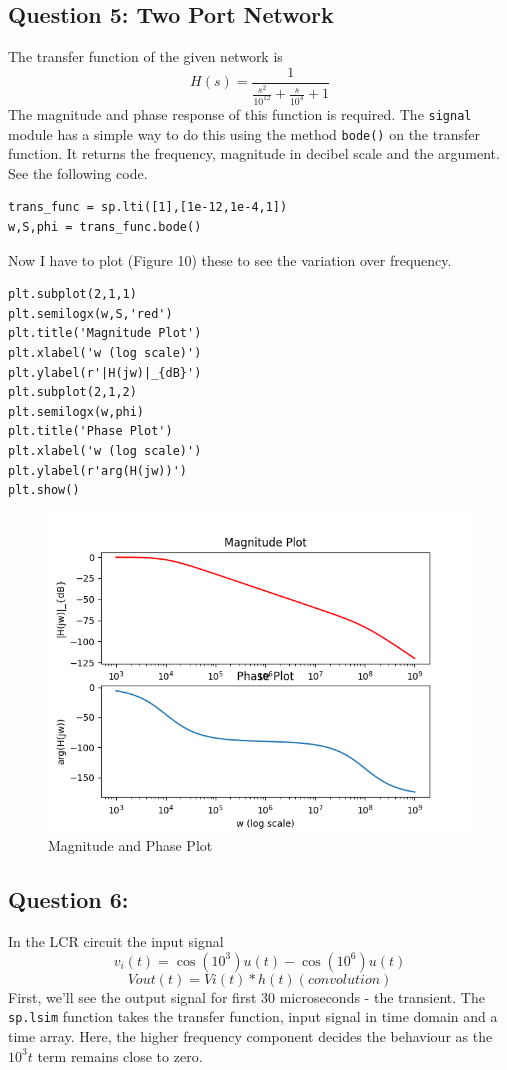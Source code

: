 \documentclass[11pt, a4paper]{article}
\begin{document}
\subsection{Question 5: Two Port Network}
The transfer function of the given network is 
$$H(s)=\frac{1}{\frac{s^2}{10^{12}}+\frac{s}{10^{4}}+1}$$
The magnitude and phase response of this function is required. The \texttt{signal} module has a simple way to do this using the method \texttt{bode()} on the transfer function. It returns the frequency, magnitude in decibel scale and the argument. See the following code.

\begin{verbatim}
trans_func = sp.lti([1],[1e-12,1e-4,1])
w,S,phi = trans_func.bode()
\end{verbatim}

Now I have to plot (Figure 10) these to see the variation over frequency.

\begin{verbatim}
plt.subplot(2,1,1)
plt.semilogx(w,S,'red')
plt.title('Magnitude Plot')
plt.xlabel('w (log scale)')
plt.ylabel(r'|H(jw)|_{dB}')
plt.subplot(2,1,2)
plt.semilogx(w,phi)
plt.title('Phase Plot')
plt.xlabel('w (log scale)')
plt.ylabel(r'arg(H(jw))')
plt.show()
\end{verbatim}

\begin{figure}[!tbh]
   	\centering
  \includegraphics[scale=0.5]{Q5.png} 
    \caption{Magnitude and Phase Plot} 	
    \label{Q5}
   \end{figure} 
   
\subsection{Question 6:}
In the LCR circuit the input signal $$v_i(t)=\cos(10^3)u(t)-\cos(10^6)u(t)$$
$$Vout(t)=Vi(t)*h(t) (convolution)$$
First, we'll see the output signal for first 30 microseconds - the transient. The \texttt{sp.lsim} function takes the transfer function, input signal in time domain and a time array. Here, the higher frequency component decides the behaviour as the $10^3t$ term remains close to zero. 
\end{document}
